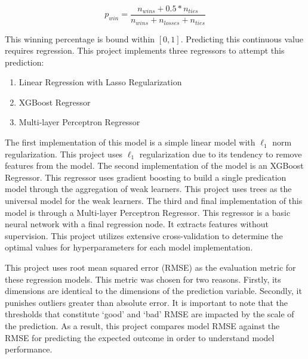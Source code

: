 \documentclass[conference]{IEEEtran}
\begin{document}
\begin{equation}
        p_{win}=\frac{n_{wins} + 0.5*n_{ties}}{n_{wins} + n_{losses} + n_{ties}}
        \label{eq1}
\end{equation}

This winning percentage is bound within $[0, 1]$. Predicting this continuous value requires regression. This project implements three regressors to attempt this prediction: 
\begin{enumerate}
  \item Linear Regression with Lasso Regularization\cite{b7}
  \item XGBoost Regressor\cite{b8}
  \item Multi-layer Perceptron Regressor\cite{b7}
\end{enumerate}

The first implementation of this model is a simple linear model with $\ell_1$ norm regularization. This project uses $\ell_1$ regularization due to its tendency to remove features from the model. The second implementation of the model is an XGBoost Regressor. This regressor uses gradient boosting to build a single predication model through the aggregation of weak learners. This project uses trees as the universal model for the weak learners. The third and final implementation of this model is through a Multi-layer Perceptron Regressor. This regressor is a basic neural network with a final regression node. It extracts features without supervision. This project utilizes extensive cross-validation to determine the optimal values for hyperparameters for each model implementation. 

This project uses root mean squared error (RMSE) as the evaluation metric for these regression models. This metric was chosen for two reasons. Firstly, its dimensions are identical to the dimensions of the prediction variable. Secondly, it punishes outliers greater than absolute error. It is important to note that the thresholds that constitute `good' and `bad' RMSE are impacted by the scale of the prediction. As a result, this project compares model RMSE against the RMSE for predicting the expected outcome in order to understand model performance. 
\end{document}
